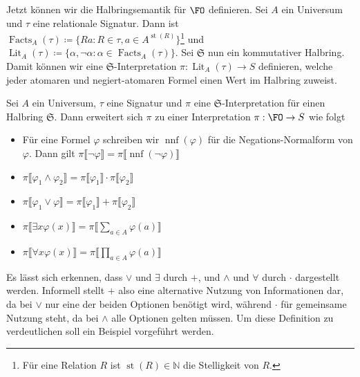 Jetzt können wir die Halbringsemantik für $\FO$ definieren.
Sei $A$ ein Universum und $\tau$ eine relationale Signatur.
Dann ist $\operatorname{Facts}_A(\tau)\coloneqq\{Ra : R\in\tau, a\in A^{\operatorname{st}(R)}\}$\footnote{Für eine Relation $R$ ist $\operatorname{st}(R)\in \mathbb{N}$ die Stelligkeit von $R$.} und $\operatorname{Lit}_A(\tau)\coloneqq \{\alpha,\neg\alpha : \alpha\in \operatorname{Facts}_A(\tau)\}$.
Sei $\mathfrak{S}$ nun ein kommutativer Halbring. 
Damit können wir eine $\mathfrak{S}$-Interpretation $\pi:\operatorname{Lit}_A(\tau)\to S$ definieren, welche jeder atomaren und negiert-atomaren Formel einen Wert im Halbring zuweist. \cite{dannert2019provenance}

\begin{definition}[Halbringsemantik $\FO$]
	Sei $A$ ein Universum, $\tau$ eine Signatur und $\pi$ eine $\mathfrak{S}$-Interpretation für einen Halbring $\mathfrak{S}$. Dann erweitert sich $\pi$ zu einer Interpretation $\pi:\FO\to S$ wie folgt \cite{dannert2019provenance}
	\begin{itemize}
		\item Für eine Formel $\varphi$ schreiben wir $\operatorname{nnf}(\varphi)$ für die Negations-Normalform von $\varphi$. Dann gilt $\pi \llbracket \neg\varphi\rrbracket = \pi\llbracket \operatorname{nnf}(\neg\varphi)\rrbracket$
		\item $\pi\llbracket \varphi_1\land \varphi_2\rrbracket = \pi\llbracket \varphi_1 \rrbracket \cdot \pi\llbracket \varphi_2 \rrbracket$
		\item $\pi \llbracket \varphi_1 \lor \varphi \rrbracket = \pi\llbracket \varphi_1 \rrbracket + \pi\llbracket \varphi_2 \rrbracket$
		\item $\pi \llbracket \exists x \varphi(x) \rrbracket = \pi \llbracket \sum_{a\in A} \varphi(a) \rrbracket$
		\item $\pi \llbracket \forall x \varphi(x) \rrbracket = \pi \llbracket \prod_{a\in A} \varphi(a) \rrbracket$
	\end{itemize}
\end{definition}

Es lässt sich erkennen, dass $\lor$ und $\exists$ durch $+$, und $\land$ und $\forall$ durch $\cdot$ dargestellt werden.
Informell stellt $+$ also eine alternative Nutzung von Informationen dar, da bei $\lor$ nur eine der beiden Optionen benötigt wird, während $\cdot$ für gemeinsame Nutzung steht, da bei $\land$ alle Optionen gelten müssen.
Um diese Definition zu verdeutlichen soll ein Beispiel vorgeführt werden.

